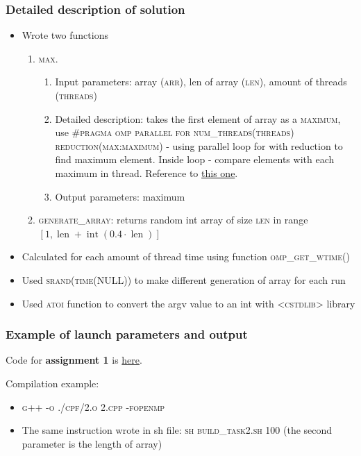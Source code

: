 \documentclass[%
12pt, %
final, %
oneside, %
onecolumn, %
centertags]{article} %
\theoremstyle{plain}
\theoremstyle{definition}
\theoremstyle{remark}
\begin{document}
\subsubsection{Detailed description of solution}

\begin{itemize}
	\item Wrote two functions
	\begin{enumerate}
		\item \textsc{max}.
		\begin{enumerate}
			\item Input parameters: array (\textsc{arr}), len of array (\textsc{len}), amount of threads (\textsc{threads})
			\item Detailed description: takes the first element of array as a \textsc{maximum}, use \textsc{\#pragma omp parallel for num\_threads(threads) reduction(max:maximum)} - using parallel loop for with reduction to find maximum element. Inside loop - compare elements with each maximum in thread. Reference to \href{https:\//stackoverflow.com/questions/35629261/max-value-in-an-array-using-openmp}{this one}.
			\item Output parameters: maximum
		\end{enumerate}
		\item \textsc{generate\_array}: returns random int array of size \textsc{len} in range $[1, \operatorname{len} + \operatorname{int}(0.4 \cdot \operatorname{len})]$
	\end{enumerate}
	\item Calculated for each amount of thread time using function \textsc{omp\_get\_wtime()}
	\item Used \textsc{srand(time(NULL))} to make different generation of array for each run
	\item Used \textsc{atoi} function to convert the argv value to an int with \textsc{<cstdlib>} library
\end{itemize}

\subsubsection{Example of launch parameters and output}

Code for \textbf{assignment 1} is \href{https:\//github.com/aptmess/parallel_algorithms/blob/master/HT/hw_openmp/prog/2.cpp}{here}.

Compilation example: 

\begin{itemize}
	\item \textsc{g++ -o ./cpf/2.o 2.cpp -fopenmp}
	\item The same instruction wrote in sh file: \textsc{sh build\_task2.sh 100} (the second parameter is the length of array)
\end{itemize}
\end{document}
